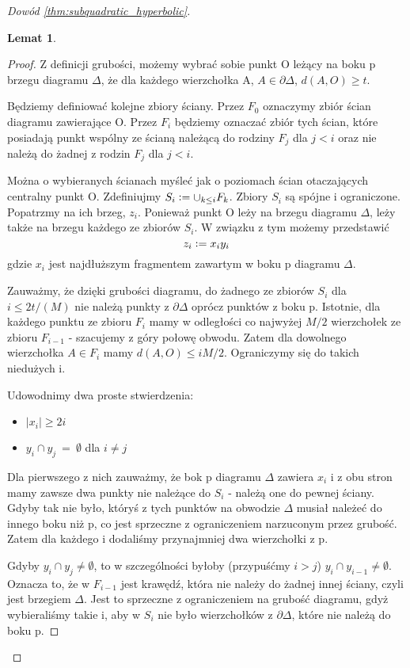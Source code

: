 \documentclass[licencjacka]{pracamgr}
\newcommand{\defeq}{\vcentcolon=}
\newtheorem{lemma}{Lemat}[section]
\begin{document}
\begin{proof}[Dowód \ref{thm:subquadratic_hyperbolic}]
\begin{lemma}
\end{lemma}

\begin{proof}

Z definicji grubości, możemy wybrać sobie punkt O leżący na boku p brzegu diagramu $\Delta$, że dla każdego wierzchołka  A, $ A \in \partial \Delta$, $d(A, O) \geq t$.

Będziemy definiować kolejne zbiory ściany. Przez $F_{0}$ oznaczymy zbiór ścian diagramu zawierające O. Przez $F_{i}$ będziemy oznaczać zbiór tych ścian, które posiadają punkt wspólny ze ścianą należącą do rodziny $F_{j}$ dla $j < i$ oraz nie należą do żadnej z rodzin $F_{j}$ dla $j < i$.

Można o wybieranych ścianach myśleć jak o poziomach ścian otaczających centralny punkt O. Zdefiniujmy $S_{i} \defeq \cup_{k \leq i} F_{k}$. Zbiory $S_{i}$ są spójne i ograniczone. Popatrzmy na ich brzeg, $z_{i}$. Ponieważ punkt O leży na brzegu diagramu $\Delta$, leży także na brzegu każdego ze zbiorów $S_{i}$. W związku z tym możemy przedstawić
\[ z_{i} \defeq x_{i} y_{i} \]
gdzie $x_{i}$ jest najdłuższym fragmentem zawartym w boku p diagramu $\Delta$.

Zauważmy, że dzięki grubości diagramu, do żadnego ze zbiorów $S_{i}$ dla $i \leq 2t /(M)$ nie należą punkty z $\partial \Delta$ oprócz punktów z boku p. Istotnie, dla każdego punktu ze zbioru $F_{i}$ mamy w odległości co najwyżej $M/2$ wierzchołek ze zbioru $F_{i-1}$ - szacujemy z góry połowę obwodu. Zatem dla dowolnego wierzchołka $A \in F_{i}$ mamy $d(A, O) \leq i M / 2$. Ograniczymy się do takich niedużych i.

Udowodnimy dwa proste stwierdzenia:

\begin{itemize}

\item $|x_{i}| \geq 2i$
\item $y_{i} \cap y_{j} \ = \ \emptyset$ dla $i \neq j$

\end{itemize}

Dla pierwszego z nich zauważmy, że bok p diagramu $\Delta$ zawiera $x_{i}$ i z obu stron mamy zawsze dwa punkty nie należące do $S_{i}$ - należą one do pewnej ściany. Gdyby tak nie było, któryś z tych punktów na obwodzie $\Delta$ musiał należeć do innego boku niż p, co jest sprzeczne z ograniczeniem narzuconym przez grubość. Zatem dla każdego i dodaliśmy przynajmniej dwa wierzchołki z p.

Gdyby $y_{i} \cap y_{j} \neq \emptyset$, to w szczególności byłoby (przypuśćmy $i > j$) $y_{i} \cap y_{i-1} \neq \emptyset$. Oznacza to, że w $F_{i-1}$ jest krawędź, która nie należy do żadnej innej ściany, czyli jest brzegiem $\Delta$. Jest to sprzeczne z ograniczeniem na grubość diagramu, gdyż wybieraliśmy takie i, aby w $S_{i}$ nie było wierzchołków z $\partial \Delta$, które nie należą do boku p.


\end{proof}
\end{proof}
\end{document}
